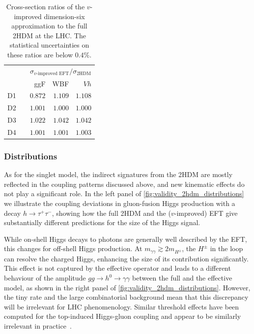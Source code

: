 \begin{table}
    \begin{tabular}{c c rrr}
      \toprule
      \multirow{2}{*}{}
      && \multicolumn{3}{c}{$\sigma_\text{$v$-improved EFT} / \sigma_\text{2HDM}$} \\
      \cmidrule{3-5}
      && ggF & WBF & $Vh$ \\
      \midrule
      D1 && $0.872$ & $1.109$ & $1.108$ \\
      D2 && $1.001$ & $1.000$ & $1.000$ \\
      D3 && $1.022$ & $1.042$ & $1.042$ \\
      D4 && $1.001$ & $1.001$ & $1.003$ \\
      \bottomrule
    \end{tabular}
    \caption[Total Higgs production rates in the 2HDM]{Cross-section ratios
      of the $v$-improved dimension-six
      approximation to the full 2HDM at the LHC. The statistical
      uncertainties on these ratios are below $0.4\%$.}
  \label{tbl:validity_2HDM_rates}
\end{table}



\subsubsection{Distributions}

As for the singlet model, the indirect signatures from the 2HDM are mostly
reflected in the coupling patterns discussed above, and new
kinematic effects do not play a significant role.  In the left panel of
\autoref{fig:validity_2hdm_distributions} we illustrate the coupling
deviations in gluon-fusion Higgs production with a decay
$h\to \tau^+ \tau^-$, showing how the full 2HDM and the ($v$-improved)
EFT give substantially different predictions for the size of the Higgs
signal.

While on-shell Higgs decays to photons are generally well described by
the EFT, this changes for off-shell Higgs production. At
$m_{\gamma \gamma} \gtrsim 2 m_{H^\pm}$, the $H^\pm$ in the loop can
resolve the charged Higgs, enhancing the size of its contribution
significantly. This effect is not captured by the effective operator
and leads to a different behaviour of the amplitude
$g g \to h^0 \to \gamma \gamma$ between the full and the effective model,
as shown in the right panel of
\autoref{fig:validity_2hdm_distributions}. However, the tiny rate
and the large combinatorial background mean that this discrepancy will
be irrelevant for LHC phenomenology. Similar threshold effects have
been computed for the top-induced Higgs-gluon coupling and appear to
be similarly irrelevant in practice~\cite{Buschmann:2014twa}.

